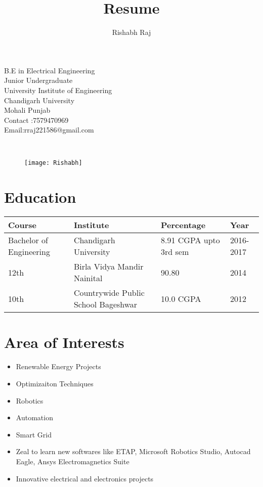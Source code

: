 \documentclass[]{article}
\begin{document}
	\title{\huge Resume}
	\author{\huge Rishabh Raj}
	\date{}
	\maketitle
	
\begin{multicols}{2}
\begin{flushleft}
B.E in Electrical Engineering\\
Junior Undergraduate\\
University Institute of Engineering\\
Chandigarh University\\
Mohali Punjab\\
Contact :7579470969\\
Email:rraj221586@gmail.com\\
\end{flushleft}
\columnbreak\\
\begin{flushright}
\begin{wrapfigure}{}{\textwidth}
\texttt{[image: Rishabh]} 
\end{wrapfigure}
\end{flushright}
\end{multicols}

\section{Education}

\begin{center}
\begin{tabular}{ |p{3cm}||p{6cm}|p{3cm}|p{2cm}|  }
 \hline
 Course & Institute & Percentage & Year\\
 \hline
 Bachelor of Engineering & Chandigarh University & 8.91 CGPA upto 3rd sem &  2016-2017\\
\linebreak
 12th & Birla Vidya Mandir Nainital & 90.80 & 2014\\
\linebreak
 10th & Countrywide Public School Bageshwar & 10.0 CGPA &  2012\\
 \hline
\end{tabular}
\end{center}

\section{Area of Interests}
\begin{itemize}
\item Renewable Energy Projects
\item Optimizaiton Techniques
\item Robotics
\item Automation
\item Smart Grid
\item Zeal to learn new softwares like ETAP, Microsoft Robotics Studio, Autocad Eagle, Ansys Electromagnetics Suite
\item Innovative electrical and electronics projects
\end{itemize}
\end{document}
